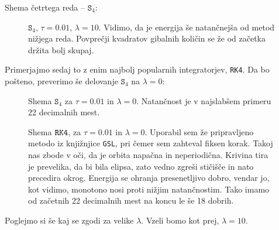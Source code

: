 \documentclass[a4 paper, 12pt]{article}
\begin{document}
Shema četrtega reda -- ${\mathtt S_4}$:

\begin{figure}[H]
   \begin{center}
      
   \end{center}
   \vspace{-20pt}
   \caption{${\mathtt S_4}$, $\tau = 0.01$, $\lambda = 10$. Vidimo, da je energija še natančnejša od metod nižjega reda.
	Povprečji kvadratov gibalnih količin se že od začetka držita bolj skupaj.}
   \label{fig:pic-L1000}
   \vspace{-10pt}
\end{figure}

Primerjajmo sedaj to z enim najbolj popularnih integratorjev, {\tt RK4}. Da bo pošteno, preverimo še delovanje ${\mathtt S_4}$
na $\lambda = 0$:

\begin{figure}[H]
   \begin{center}
      
   \end{center}
   \vspace{-20pt}
   \caption{Shema ${\mathtt S_4}$ za $\tau = 0.01$ in $\lambda = 0$. Natančnost je v najslabšem primeru 22 decimalnih mest.}
   \label{fig:pic-L0}
   \vspace{-10pt}
\end{figure}

\begin{figure}[H]
   \begin{center}
      
   \end{center}
   \vspace{-20pt}
   \caption{Shema ${\tt RK4}$, za $\tau = 0.01$ in $\lambda = 0$. Uporabil sem že pripravljeno metodo iz knjižnjice
	{\tt GSL}, pri čemer sem zahteval fiksen korak. Takoj nas zbode v oči, da je orbita napačna in neperiodična.
	Krivina tira je prevelika, da bi bila elipsa, zato vedno zgreši stičišče in nato precedira okrog. Energija se
	ohranja presenetljivo dobro, vendar jo, kot vidimo, monotono nosi proti nižjim natančnostim. Tako imamo od začetnih
	22 decimalnih mest na koncu le še 18 dobrih.}
   \label{fig:pic-L0}
   \vspace{-10pt}
\end{figure}

Poglejmo si še kaj se zgodi za velike $\lambda$. Vzeli bomo kot prej, $\lambda = 10$.
\end{document}
